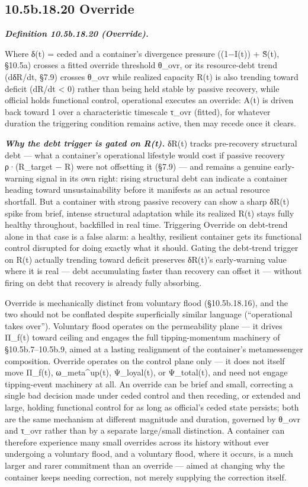 \documentclass[
]{article}
\begin{document}
\hypertarget{b.18.20-override}{%
\subsection{10.5b.18.20 Override}\label{b.18.20-override}}

\emph{\textbf{Definition 10.5b.18.20 (Override).}}

Where δ(t) = ceded and a container's divergence pressure ((1−I(t)) +
S̃(t), §10.5a) crosses a fitted override threshold θ\_ovr, or its
resource-debt trend (dδR/dt, §7.9) crosses θ\_ovr while realized
capacity R(t) is also trending toward deficit (dR/dt \textless{} 0)
rather than being held stable by passive recovery, while official holds
functional control, operational executes an override: A(t) is driven
back toward 1 over a characteristic timescale τ\_ovr (fitted), for
whatever duration the triggering condition remains active, then may
recede once it clears.

\emph{\textbf{Why the debt trigger is gated on R(t).}} δR(t) tracks
pre-recovery structural debt --- what a container's operational
lifestyle would cost if passive recovery ρ·(R\_target − R) were not
offsetting it (§7.9) --- and remains a genuine early-warning signal in
its own right: rising structural debt can indicate a container heading
toward unsustainability before it manifests as an actual resource
shortfall. But a container with strong passive recovery can show a sharp
δR(t) spike from brief, intense structural adaptation while its realized
R(t) stays fully healthy throughout, backfilled in real time. Triggering
Override on debt-trend alone in that case is a false alarm: a healthy,
resilient container gets its functional control disrupted for doing
exactly what it should. Gating the debt-trend trigger on R(t) actually
trending toward deficit preserves δR(t)'s early-warning value where it
is real --- debt accumulating faster than recovery can offset it ---
without firing on debt that recovery is already fully absorbing.

Override is mechanically distinct from voluntary flood (§10.5b.18.16),
and the two should not be conflated despite superficially similar
language (``operational takes over''). Voluntary flood operates on the
permeability plane --- it drives Π\_f(t) toward ceiling and engages the
full tipping-momentum machinery of §10.5b.7--10.5b.9, aimed at a lasting
realignment of the container's metamessenger composition. Override
operates on the control plane only --- it does not itself move Π\_f(t),
ω\_meta\^{}up(t), Ψ\_loyal(t), or Ψ\_total(t), and need not engage
tipping-event machinery at all. An override can be brief and small,
correcting a single bad decision made under ceded control and then
receding, or extended and large, holding functional control for as long
as official's ceded state persists; both are the same mechanism at
different magnitude and duration, governed by θ\_ovr and τ\_ovr rather
than by a separate large/small distinction. A container can therefore
experience many small overrides across its history without ever
undergoing a voluntary flood, and a voluntary flood, where it occurs, is
a much larger and rarer commitment than an override --- aimed at
changing why the container keeps needing correction, not merely
supplying the correction itself.
\end{document}
